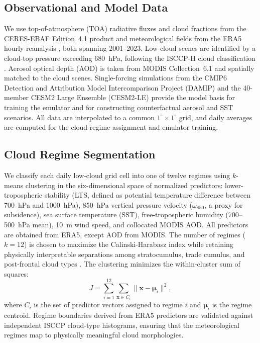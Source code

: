 \documentclass{article}
\begin{document}
\subsection{Observational and Model Data}
We use top-of-atmosphere (TOA) radiative fluxes and cloud fractions from the CERES-EBAF Edition~4.1 product \cite{loeb2018ceres} and meteorological fields from the ERA5 hourly reanalysis \cite{hersbach2020era5}, both spanning 2001--2023. Low-cloud scenes are identified by a cloud-top pressure exceeding 680~hPa, following the ISCCP-H cloud classification \cite{rossow1999isccp}. Aerosol optical depth (AOD) is taken from MODIS Collection~6.1 \cite{levy2013modis} and spatially matched to the cloud scenes. Single-forcing simulations from the CMIP6 Detection and Attribution Model Intercomparison Project (DAMIP) \cite{gillett2016damip} and the 40-member CESM2 Large Ensemble (CESM2-LE) \cite{rodgers2021cesm2le} provide the model basis for training the emulator and for constructing counterfactual aerosol and SST scenarios. All data are interpolated to a common $1^\circ \times 1^\circ$ grid, and daily averages are computed for the cloud-regime assignment and emulator training.

\subsection{Cloud Regime Segmentation}
We classify each daily low-cloud grid cell into one of twelve regimes using $k$-means clustering \cite{macqueen1967some} in the six-dimensional space of normalized predictors: lower-tropospheric stability (LTS, defined as potential temperature difference between 700~hPa and 1000~hPa), 850~hPa vertical pressure velocity ($\omega_{850}$, a proxy for subsidence), sea surface temperature (SST), free-tropospheric humidity (700--500~hPa mean), 10~m wind speed, and collocated MODIS AOD. All predictors are obtained from ERA5, except AOD from MODIS. The number of regimes ($k=12$) is chosen to maximize the Calinski-Harabasz index while retaining physically interpretable separations among stratocumulus, trade cumulus, and post-frontal cloud types \cite{oreopoulos2014isccp}. The clustering minimizes the within-cluster sum of squares:
\begin{equation}
J = \sum_{i=1}^{12} \sum_{\mathbf{x} \in C_i} \|\mathbf{x} - \boldsymbol{\mu}_i\|^2,
\label{eq:kmeans}
\end{equation}
where $C_i$ is the set of predictor vectors assigned to regime $i$ and $\boldsymbol{\mu}_i$ is the regime centroid. Regime boundaries derived from ERA5 predictors are validated against independent ISCCP cloud-type histograms, ensuring that the meteorological regimes map to physically meaningful cloud morphologies.
\end{document}
